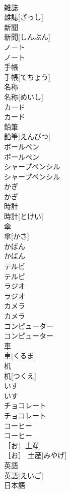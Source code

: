 \documentclass[8pt]{extreport}
\begin{document}
\begin{CJK}{UTF8}{min}
\\	雑誌	
\\	雑誌[ざっし]	
\\	新聞	
\\	新聞[しんぶん]	
\\	ノート	
\\	ノート	
\\	手帳	
\\	手帳[てちょう]	
\\	名称	
\\	名称[めいし]	
\\	カード	
\\	カード	
\\	鉛筆	
\\	鉛筆[えんぴつ]	
\\	ボールペン	
\\	ボールペン	
\\	シャープペンシル	
\\	シャープペンシル	
\\	かぎ	
\\	かぎ	
\\	時計	
\\	時計[とけい]	
\\	傘	
\\	傘[かさ]	
\\	かばん	
\\	かばん	
\\	テルビ	
\\	テルビ	
\\	ラジオ	
\\	ラジオ	
\\	カメラ	
\\	カメラ	
\\	コンピューター	
\\	コンピューター	
\\	車	
\\	車[くるま]	
\\	机	
\\	机[つくえ]	
\\	いす	
\\	いす	
\\	チョコレート	
\\	チョコレート	
\\	コーヒー	
\\	コーヒー	
\\	［お］土産	
\\	［お］ 土産[みやげ]	
\\	英語	
\\	英語[えいご]	
\\	日本語	

\end{CJK}
\end{document}

